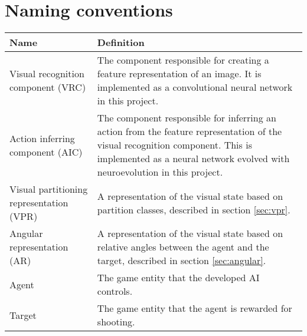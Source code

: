 
\section{Naming conventions}

\begin{table}[H]
\begin{center}

\begin{tabularx}{\textwidth}{ | l | X |}
		\hline
	
		\textbf{Name} & \textbf{Definition} \\ \hline
		Visual recognition component (VRC) & The component responsible for creating a feature representation of an image. It is implemented as a convolutional neural network in this project. \\ \hline
		Action inferring component (AIC) & The component responsible for inferring an action from the feature representation of the visual recognition component. This is implemented as a neural network evolved with neuroevolution in this project. \\ \hline
		Visual partitioning representation (VPR) & A representation of the visual state based on partition classes, described in section \ref{sec:vpr}. \\ \hline
		
		Angular representation (AR) & A representation of the visual state based on relative angles between the agent and the target, described in section \ref{sec:angular}. \\ \hline
		Agent & The game entity that the developed AI controls. \\ \hline
		Target & The game entity that the agent is rewarded for shooting. \\ \hline
		
\end{tabularx}
\end{center}
\label{tab:naming-conventions} 
\end{table}

\newpage